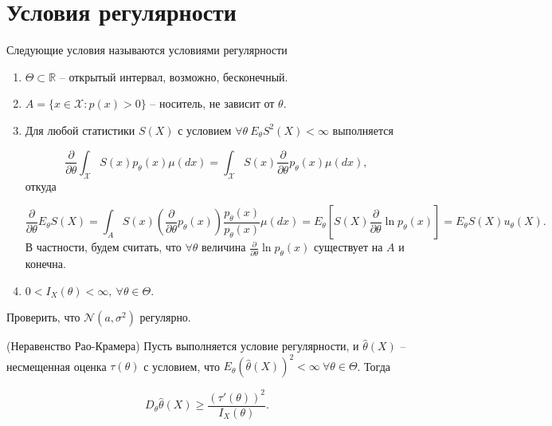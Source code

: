 \section{Условия регулярности}
\begin{definition}
Следующие условия называются условиями регулярности
\end{definition}
\begin{enumerate}
\item $\displaystyle \Theta \subset \mathbb{R}$ -- открытый интервал, возможно, бесконечный.
\item $\displaystyle A=\{x\in \mathcal{X} :p( x)  >0\}$ -- носитель, не зависит от $\displaystyle \theta $.
\item Для любой статистики $\displaystyle S( X)$ с условием $\displaystyle \forall \theta \ E_{\theta } S^{2}( X) < \infty $ выполняется


\begin{equation*}
\frac{\partial }{\partial \theta }\int _{\mathcal{X}} S( x) p_{\theta }( x) \mu ( dx) =\int _{\mathcal{X}} S( x)\frac{\partial }{\partial \theta } p_{\theta }( x) \mu ( dx) ,
\end{equation*}
откуда


\begin{equation*}
\frac{\partial }{\partial \theta } E_{\theta } S( X) =\int _{A} S( x)\left(\frac{\partial }{\partial \theta } p_{\theta }( x)\right)\frac{p_{\theta }( x)}{p_{\theta }( x)} \mu ( dx) =E_{\theta }\left[ S( X)\frac{\partial }{\partial \theta }\ln p_{\theta }( x)\right] =E_{\theta } S( X) u_{\theta }( X) .
\end{equation*}
В частности, будем считать, что $\displaystyle \forall \theta $ величина $\displaystyle \frac{\partial }{\partial \theta }\ln p_{\theta }( x)$ существует на $\displaystyle A$ и конечна.
\item $\displaystyle 0< I_{X}( \theta ) < \infty, \ \forall \theta \in \Theta $.
\end{enumerate}
\begin{exercise}
Проверить, что $\displaystyle \mathcal{N}\left( a,\sigma ^{2}\right)$ регулярно.
\end{exercise}
\begin{theorem}
(Неравенство Рао-Крамера) Пусть выполняется условие регулярности, и $\displaystyle \hat{\theta }( X)$ -- несмещенная оценка $\displaystyle \tau ( \theta )$ с условием, что $\displaystyle E_{\theta }(\hat{\theta }( X))^{2} < \infty \ \forall \theta \in \Theta $. Тогда


\begin{equation*}
D_{\theta }\hat{\theta }( X) \geqslant \frac{( \tau '( \theta ))^{2}}{I_{X}( \theta )} .
\end{equation*}
\end{theorem}

